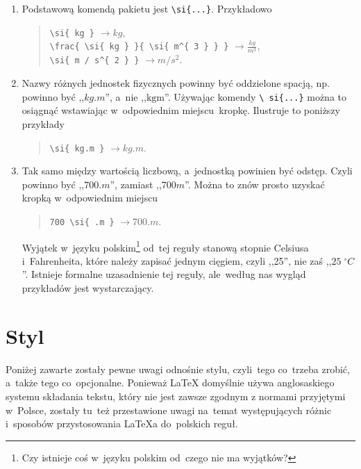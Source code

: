 \documentclass[a4paper,11pt]{article}
\newcommand{\tbs}{\textbackslash}  %
\begin{document}
\begin{enumerate}
\item Podstawową komendą pakietu jest \texttt{\tbs si\{...\}}.
  Przykładowo
  \begin{quote}
    \texttt{\tbs si\{ kg \}} $\longrightarrow \si{kg}$, \\
    \texttt{\tbs frac\{ \tbs si\{ kg \} \}\{ \tbs si\{ m\^{}\{ 3 \} \}
      \}}
    $\longrightarrow \frac{ \si{ kg } }{ \si{ m^{ 3 } } }$, \\
    \texttt{\tbs si\{ m / s\^{}\{ 2 \} \}}
    $\longrightarrow \si{ m / s^{ 2 } }$.
  \end{quote}

\item Nazwy różnych jednostek fizycznych powinny być oddzielone
  spacją, np. powinno być ,,$\si{kg.m}$'', a~nie
  ,,$\textrm{kg}\textrm{m}$''. Używając komendy \texttt{\tbs
    si\{...\}} można to osiągnąć wstawiając w~odpowiednim
  miejscu~kropkę. Ilustruje to poniższy przykłady
  \begin{quote}
    \texttt{\tbs si\{ kg.m \}} $\longrightarrow \si{kg.m}$.
  \end{quote}

\item Tak samo między wartością liczbową, a~jednostką powinien być
  odstęp. Czyli powinno być ,,$700 \si{.m}$'', zamiast
  ,,$700 \si{m}$''. Można to znów prosto uzyskać kropką w~odpowiednim
  miejscu
  \begin{quote}
    \texttt{700 \tbs si\{ .m \}} $\longrightarrow 700 \si{ .m }$.
  \end{quote}
  Wyjątek w~języku polskim\footnote{Czy istnieje coś w~języku polskim
    od~czego nie ma wyjątków?} od~tej reguły stanową stopnie Celsiusa
  i~Fahrenheita, które należy zapisać jednym cięgiem, czyli
  ,,25\textcelsius'', nie zaś ,,$25\; ^{ \circ }\si{C}$''. Istnieje
  formalne uzasadnienie tej reguły, ale~według nas wygląd przykładów jest
  wystarczający.
\end{enumerate}





\section{Styl}
\label{sec:styl}

Poniżej zawarte zostały pewne uwagi odnośnie stylu, czyli~tego
co~trzeba zrobić, a~także tego co~opcjonalne. Ponieważ \LaTeX{}
domyślnie używa anglosaskiego systemu składania tekstu, który nie jest
zawsze zgodnym z normami przyjętymi w~Polsce, zostały tu~też
przestawione uwagi na~temat występujących różnic i~sposobów
przystosowania \LaTeX a do~polskich reguł.
\end{document}
